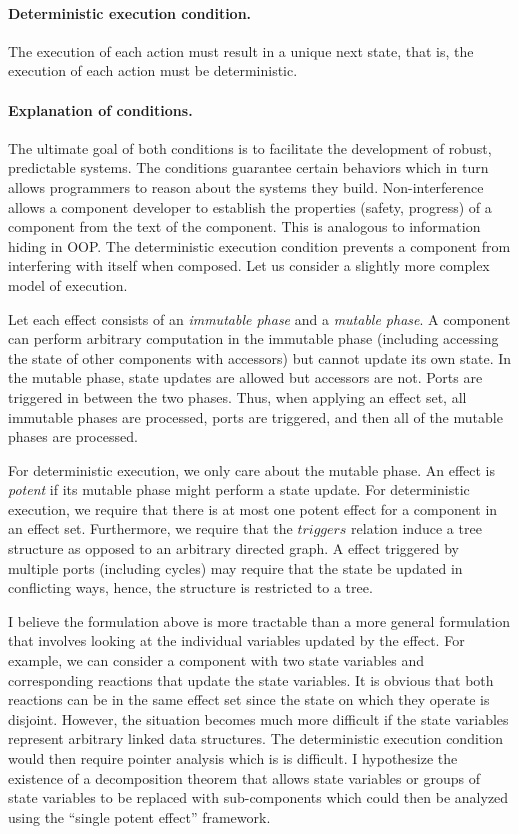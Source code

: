 \paragraph{Deterministic execution condition.}
The execution of each action must result in a unique next state, that is, the execution of each action must be deterministic.

\paragraph{Explanation of conditions.}
The ultimate goal of both conditions is to facilitate the development of robust, predictable systems.
The conditions guarantee certain behaviors which in turn allows programmers to reason about the systems they build.
Non-interference allows a component developer to establish the properties (safety, progress) of a component from the text of the component.
This is analogous to information hiding in OOP.
The deterministic execution condition prevents a component from interfering with itself when composed.
Let us consider a slightly more complex model of execution.

Let each effect consists of an \emph{immutable phase} and a \emph{mutable phase}.
A component can perform arbitrary computation in the immutable phase (including accessing the state of other components with accessors) but cannot update its own state.
In the mutable phase, state updates are allowed but accessors are not.
Ports are triggered in between the two phases.
Thus, when applying an effect set, all immutable phases are processed, ports are triggered, and then all of the mutable phases are processed.

For deterministic execution, we only care about the mutable phase.
An effect is \emph{potent} if its mutable phase might perform a state update.
For deterministic execution, we require that there is at most one potent effect for a component in an effect set.
Furthermore, we require that the $triggers$ relation induce a tree structure as opposed to an arbitrary directed graph.
A effect triggered by multiple ports (including cycles) may require that the state be updated in conflicting ways, hence, the structure is restricted to a tree.

I believe the formulation above is more tractable than a more general formulation that involves looking at the individual variables updated by the effect.
For example, we can consider a component with two state variables and corresponding reactions that update the state variables.
It is obvious that both reactions can be in the same effect set since the state on which they operate is disjoint.
However, the situation becomes much more difficult if the state variables represent arbitrary linked data structures.
The deterministic execution condition would then require pointer analysis which is is difficult.
I hypothesize the existence of a decomposition theorem that allows state variables or groups of state variables to be replaced with sub-components which could then be analyzed using the ``single potent effect'' framework.

